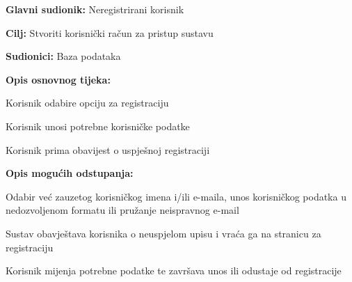 \noindent {}
					\begin{packed_item}
	
						\item \textbf{Glavni sudionik: }Neregistrirani korisnik
						\item  \textbf{Cilj:} Stvoriti korisnički račun za pristup sustavu
						\item  \textbf{Sudionici:} Baza podataka
						\item  \textbf{Opis osnovnog tijeka:						
						}
						
						\item[] \begin{packed_enum}
	
							\item Korisnik odabire opciju za registraciju
							\item Korisnik unosi potrebne korisničke podatke
							\item Korisnik prima obavijest o uspješnoj registraciji
							
						\end{packed_enum}
						
						\item  \textbf{Opis mogućih odstupanja:}
						
						\item[] \begin{packed_item}
	
							\item[4.a] Odabir već zauzetog korisničkog imena i/ili e-maila, unos 
korisničkog podatka u nedozvoljenom formatu ili pružanje 
neispravnog e-mail

							\item[] \begin{packed_enum}
								
								\item Sustav obavještava korisnika o neuspjelom upisu i vraća 
ga na stranicu za registraciju
								\item Korisnik mijenja potrebne podatke te završava unos ili 
odustaje od registracije
																
							\end{packed_enum}
														
						\end{packed_item}
					\end{packed_item}
					
